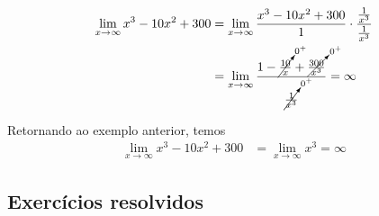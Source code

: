 \cleardoublepage\documentclass[../main.tex]{subfiles}
\begin{document}
\begin{ex}\label{ex:liminf_poli}
  \begin{align*}
    \lim_{x\to \infty} x^3 - 10x^2 + 300 &= \lim_{x\to \infty} \frac{x^3 - 10x^2 + 300}{1}\cdot\frac{\frac{1}{x^3}}{\frac{1}{x^3}}\\
                                         &= \lim_{x\to \infty} \frac{1 - \cancelto{0^+}{\frac{10}{x}} + \cancelto{0^+}{\frac{300}{x^3}}}{\cancelto{0^+}{\frac{1}{x^3}}} = \infty                                
  \end{align*}
\end{ex}

\begin{ex}
  Retornando ao exemplo anterior, temos
  \begin{align*}
    \lim_{x\to \infty} x^3 - 10x^2 + 300 &= \lim_{x\to \infty} x^3 = \infty
  \end{align*}
\end{ex}

\subsection{Exercícios resolvidos}
\end{document}
